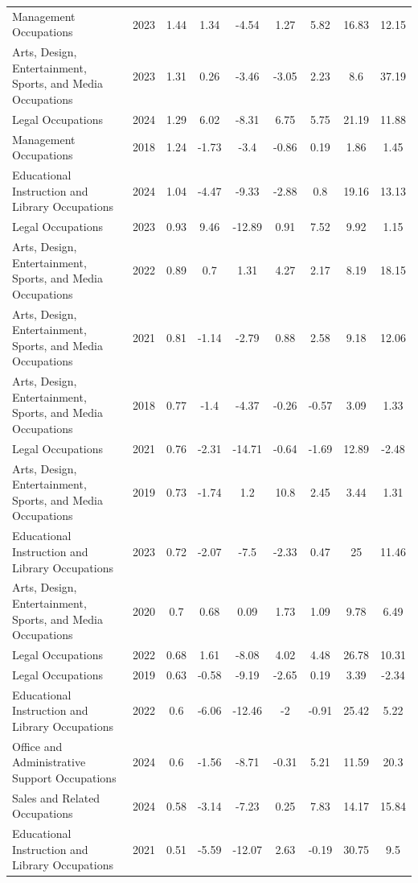 \begin{table}[htbp]
\begin{tabular}{lcccccccc}
Management Occupations & 2023 & 1.44 & 1.34 & -4.54 & 1.27 & 5.82 & 16.83 & 12.15 \\
Arts, Design, Entertainment, Sports, and Media Occupations & 2023 & 1.31 & 0.26 & -3.46 & -3.05 & 2.23 & 8.6 & 37.19 \\
Legal Occupations & 2024 & 1.29 & 6.02 & -8.31 & 6.75 & 5.75 & 21.19 & 11.88 \\
Management Occupations & 2018 & 1.24 & -1.73 & -3.4 & -0.86 & 0.19 & 1.86 & 1.45 \\
Educational Instruction and Library Occupations & 2024 & 1.04 & -4.47 & -9.33 & -2.88 & 0.8 & 19.16 & 13.13 \\
Legal Occupations & 2023 & 0.93 & 9.46 & -12.89 & 0.91 & 7.52 & 9.92 & 1.15 \\
Arts, Design, Entertainment, Sports, and Media Occupations & 2022 & 0.89 & 0.7 & 1.31 & 4.27 & 2.17 & 8.19 & 18.15 \\
Arts, Design, Entertainment, Sports, and Media Occupations & 2021 & 0.81 & -1.14 & -2.79 & 0.88 & 2.58 & 9.18 & 12.06 \\
Arts, Design, Entertainment, Sports, and Media Occupations & 2018 & 0.77 & -1.4 & -4.37 & -0.26 & -0.57 & 3.09 & 1.33 \\
Legal Occupations & 2021 & 0.76 & -2.31 & -14.71 & -0.64 & -1.69 & 12.89 & -2.48 \\
Arts, Design, Entertainment, Sports, and Media Occupations & 2019 & 0.73 & -1.74 & 1.2 & 10.8 & 2.45 & 3.44 & 1.31 \\
Educational Instruction and Library Occupations & 2023 & 0.72 & -2.07 & -7.5 & -2.33 & 0.47 & 25 & 11.46 \\
Arts, Design, Entertainment, Sports, and Media Occupations & 2020 & 0.7 & 0.68 & 0.09 & 1.73 & 1.09 & 9.78 & 6.49 \\
Legal Occupations & 2022 & 0.68 & 1.61 & -8.08 & 4.02 & 4.48 & 26.78 & 10.31 \\
Legal Occupations & 2019 & 0.63 & -0.58 & -9.19 & -2.65 & 0.19 & 3.39 & -2.34 \\
Educational Instruction and Library Occupations & 2022 & 0.6 & -6.06 & -12.46 & -2 & -0.91 & 25.42 & 5.22 \\
Office and Administrative Support Occupations & 2024 & 0.6 & -1.56 & -8.71 & -0.31 & 5.21 & 11.59 & 20.3 \\
Sales and Related Occupations & 2024 & 0.58 & -3.14 & -7.23 & 0.25 & 7.83 & 14.17 & 15.84 \\
Educational Instruction and Library Occupations & 2021 & 0.51 & -5.59 & -12.07 & 2.63 & -0.19 & 30.75 & 9.5 \\

\end{tabular}
\end{table}
